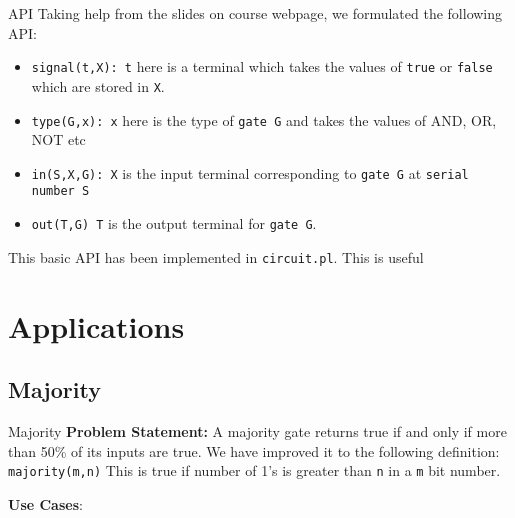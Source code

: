 \documentclass{beamer}
\begin{document}
\begin{frame}{API}
Taking help from the slides on course webpage, we formulated the following API:
\begin{itemize}
\item \texttt{signal(t,X): t}  here is a terminal which takes the values of \texttt{true} or \texttt{false} which are stored in \texttt{X}.

\item \texttt{type(G,x): x} here is the type of \texttt{gate G} and takes the values of AND, OR, NOT etc

\item  \texttt{in(S,X,G): X} is the input terminal corresponding to \texttt{gate G} at \texttt{serial number S}
\item \texttt{out(T,G) T} is the output terminal for \texttt{gate G}.
\end{itemize}
This basic API has been implemented in \texttt{circuit.pl}. This is useful
\end{frame}


\section{Applications}
\subsection{Majority}
\begin{frame}{Majority}
\textbf{Problem Statement:} A majority gate returns true if and only if more than 50\% of its inputs are true. We have improved it to the following definition:
\newline
\texttt{majority(m,n)} This is true if number of 1's is greater than \texttt{n} in a \texttt{m} bit number.

\textbf{Use Cases}: 
\end{frame}
\end{document}
